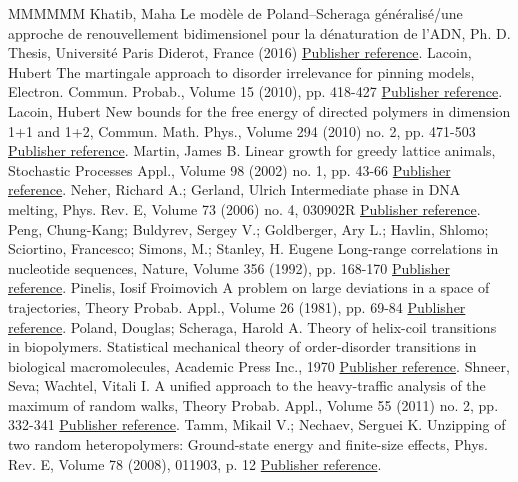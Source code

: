 \documentclass[11pt]{article}
\theoremstyle{definition}
\numberwithin{equation}{section}
\numberwithin{figure}{section}
\numberwithin{table}{section}
\begin{document}
\begin{thebibliography}{MMMMMM}
 Khatib, Maha Le modèle de Poland–Scheraga généralisé/une approche de renouvellement bidimensionel pour la dénaturation de l’ADN, Ph. D. Thesis, Université Paris Diderot, France (2016) \href{https://ahl.centre-mersenne.org/item/AHL_2020__3__299_0/#cf:Khatib}{Publisher reference}.
 Lacoin, Hubert The martingale approach to disorder irrelevance for pinning models, Electron. Commun. Probab., Volume 15 (2010), pp. 418-427 \href{https://ahl.centre-mersenne.org/item/AHL_2020__3__299_0/#cf:Lac}{Publisher reference}.
 Lacoin, Hubert New bounds for the free energy of directed polymers in dimension 1+1 and 1+2, Commun. Math. Phys., Volume 294 (2010) no. 2, pp. 471-503 \href{https://ahl.centre-mersenne.org/item/AHL_2020__3__299_0/#cf:La10}{Publisher reference}.
 Martin, James B. Linear growth for greedy lattice animals, Stochastic Processes Appl., Volume 98 (2002) no. 1, pp. 43-66 \href{https://ahl.centre-mersenne.org/item/AHL_2020__3__299_0/#cf:Martin02}{Publisher reference}.
 Neher, Richard A.; Gerland, Ulrich Intermediate phase in DNA melting, Phys. Rev. E, Volume 73 (2006) no. 4, 030902R \href{https://ahl.centre-mersenne.org/item/AHL_2020__3__299_0/#cf:NG06}{Publisher reference}.
 Peng, Chung-Kang; Buldyrev, Sergey V.; Goldberger, Ary L.; Havlin, Shlomo; Sciortino, Francesco; Simons, M.; Stanley, H. Eugene Long-range correlations in nucleotide sequences, Nature, Volume 356 (1992), pp. 168-170 \href{https://ahl.centre-mersenne.org/item/AHL_2020__3__299_0/#cf:Peng}{Publisher reference}.
 Pinelis, Iosif Froimovich A problem on large deviations in a space of trajectories, Theory Probab. Appl., Volume 26 (1981), pp. 69-84 \href{https://ahl.centre-mersenne.org/item/AHL_2020__3__299_0/#cf:Pi81}{Publisher reference}.
 Poland, Douglas; Scheraga, Harold A. Theory of helix-coil transitions in biopolymers. Statistical mechanical theory of order-disorder transitions in biological macromolecules, Academic Press Inc., 1970 \href{https://ahl.centre-mersenne.org/item/AHL_2020__3__299_0/#cf:PSbook}{Publisher reference}.
 Shneer, Seva; Wachtel, Vitali I. A unified approach to the heavy-traffic analysis of the maximum of random walks, Theory Probab. Appl., Volume 55 (2011) no. 2, pp. 332-341 \href{https://ahl.centre-mersenne.org/item/AHL_2020__3__299_0/#cf:SW11}{Publisher reference}.
 Tamm, Mikail V.; Nechaev, Serguei K. Unzipping of two random heteropolymers: Ground-state energy and finite-size effects, Phys. Rev. E, Volume 78 (2008), 011903, p. 12 \href{https://ahl.centre-mersenne.org/item/AHL_2020__3__299_0/#cf:TN08}{Publisher reference}.

\end{thebibliography}
\end{document}
